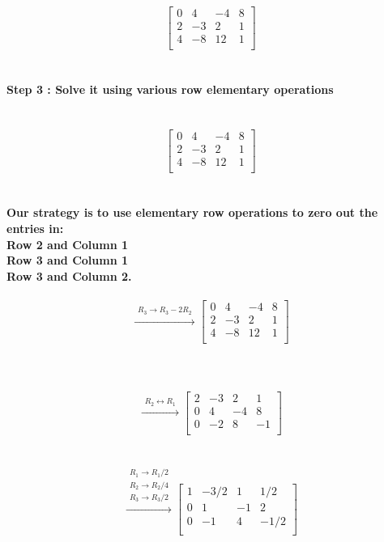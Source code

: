 \documentclass[15pt]{article}
\begin{document}
\[
 \left[\begin{array}{rrr|r}
  0 &  4 & -4 & 8 \\
  2 & -3 &  2 & 1 \\
  4 & -8 & 12 & 1 \\ 
   \end{array} \right]
\]\\
\\
\textbf{Step 3 : Solve it using various row elementary operations }\\
\\
\\
\[
\left[\begin{array}{rrr|r}
  0 &  4 & -4 & 8 \\
  2 & -3 &  2 & 1\\
  4 & -8 & 12 & 1  \\
  \end{array}\right]
  \]
  \\
  \\
  \textbf{Our strategy is to use elementary row operations to zero out the entries in: \\ Row 2 and Column 1\\ Row 3 and Column 1 \\ Row 3 and Column 2.}
  \\
  \\
  \[
  \xrightarrow{\substack{R_3 \rightarrow R_3 - 2R_2}}
  \left[\begin{array}{rrr|r}
0 &  4& -4 & 8 \\
2 & -3 & 2 & 1 \\
4 & -8 & 12 & 1 \\
  
  \end{array}\right]
  \]
  \\
  \\
  \
  \[
 \xrightarrow{\substack{R_2 \leftrightarrow R_1}}
\left[\begin{array}{rrr|r}
  2 & -3& 2 & 1 \\
  0 & 4 & -4 & 8 \\
  0 & -2 & 8 & -1 \\
  \end{array}\right]
  \]\\
  \\
  \[
 \xrightarrow{\substack{R_1 \rightarrow R_1/2\\R_2\rightarrow R_2/4\\R_3\rightarrow R_3/2}}
\left[\begin{array}{rrr|r}
  1 & -3/2& 1 & 1/2 \\
  0 & 1 & -1 & 2 \\
  0 & -1 & 4 & -1/2 \\
  \end{array}\right]
  \]\\
\end{document}
